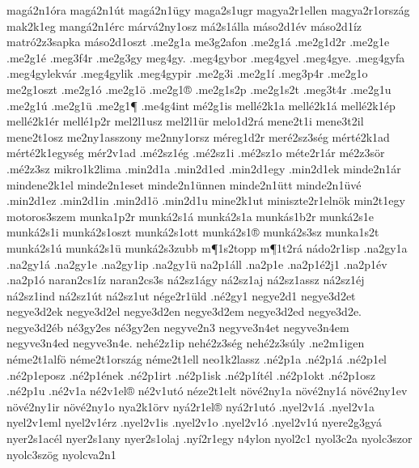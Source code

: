 {mag^^e12n1^^f3ra
mag^^e12n1^^fat
mag^^e12n1^^fcgy
maga2s1ugr
magya2r1ellen
magya2r1orsz^^e1g
mak2k1eg
mang^^e12n1^^e9rc
m^^e1rv^^e12ny1osz
m^^e12s1^^e1lla
m^^e1so2d1^^e9v
m^^e1so2d1^^edz
matr^^f32z3sapka
m^^e1so2d1oszt
.me2g1a
me3g2afon
.me2g1^^e1
.me2g1d2r
.me2g1e
.me2g1^^e9
.meg3f4r
.me2g3gy
meg4gy.
.meg4gybor
.meg4gyel
.meg4gye.
.meg4gyfa
.meg4gylekv^^e1r
.meg4gylik
.meg4gypir
.me2g3i
.me2g1^^ed
.meg3p4r
.me2g1o
me2g1oszt
.me2g1^^f3
.me2g1^^f6
.me2g1^^ae
.me2g1s2p
.me2g1s2t
.meg3t4r
.me2g1u
.me2g1^^fa
.me2g1^^fc
.me2g1^^b6
.me4g4int
m^^e92g1is
mell^^e92k1a
mell^^e92k1^^e1
mell^^e92k1^^e9p
mell^^e92k1^^e9r
mell^^e91p2r
mel2l1usz
mel2l1^^fcr
melo1d2r^^e1
mene2t1i
mene3t2il %
mene2t1osz
me2ny1asszony
me2nny1orsz
m^^e9reg1d2r
mer^^e92sz3s^^e9g
m^^e9rt^^e92k1ad
m^^e9rt^^e92k1egys^^e9g
m^^e9r2v1ad
.m^^e92sz1^^e9g
.m^^e92sz1i
.m^^e92sz1o
m^^e9te2r1^^e1r
m^^e92z3s^^f6r
.m^^e92z3sz
mikro1k2lima
.min2d1a
.min2d1ed
.min2d1egy
.min2d1ek
minde2n1^^e1r
mindene2k1el
minde2n1eset
minde2n1^^fcnnen
minde2n1^^fctt          %
minde2n1^^fcv^^e9          %
.min2d1ez
.min2d1in
.min2d1^^f6
.min2d1u
mine2k1ut
miniszte2r1eln^^f6k
min2t1egy
motoros3szem
munka1p2r
munk^^e12s1^^e1
munk^^e12s1a
munk^^e1s1b2r
munk^^e12s1e
munk^^e12s1i
munk^^e12s1oszt
munk^^e12s1ott
munk^^e12s1^^ae
munk^^e12s3sz
munka1s2t
munk^^e12s1^^fa
munk^^e12s1^^fc
munk^^e12s3zubb
m^^b61s2topp
m^^b61t2r^^e1
n^^e1do2r1isp
.na2gy1a
.na2gy1^^e1
.na2gy1e
.na2gy1ip
.na2gy1^^fc
na2p1^^e1ll
.na2p1e
.na2p1^^e92j1 %
.na2p1^^e9v
.na2p1^^f3
naran2cs1^^edz
naran2cs3s
n^^e12sz1^^e1gy
n^^e12sz1aj
n^^e12sz1assz
n^^e12sz1^^e9j
n^^e12sz1ind
n^^e12sz1^^fat
n^^e12sz1ut
n^^e9ge2r1^^fcld
.n^^e92gy1
negye2d1
negye3d2et
negye3d2ek
negye3d2el
negye3d2en
negye3d2em
negye3d2ed
negye3d2e.
negye3d2^^e9b %
n^^e93gy2es
n^^e93gy2en
negyve2n3
negyve3n4et
negyve3n4em
negyve3n4ed
negyve3n4e.
neh^^e92z1ip
neh^^e92z3s^^e9g
neh^^e92z3s^^faly
.ne2m1igen
n^^e9me2t1alf^^f6
n^^e9me2t1orsz^^e1g
n^^e9me2t1ell
neo1k2lassz
.n^^e92p1a
.n^^e92p1^^e1
.n^^e92p1el
.n^^e92p1eposz
.n^^e92p1^^e9nek
.n^^e92p1irt
.n^^e92p1isk
.n^^e92p1^^edt^^e9l
.n^^e92p1okt
.n^^e92p1osz
.n^^e92p1u
.n^^e92v1a
n^^e92v1el^^ae
n^^e92v1ut^^f3
n^^e9ze2t1elt
n^^f6v^^e92ny1a
n^^f6v^^e92ny1^^e1
n^^f6v^^e92ny1ev
n^^f6v^^e92ny1ir
n^^f6v^^e92ny1o
nya2k1^^f6rv
ny^^e12r1el^^ae
ny^^e12r1ut^^f3
.nyel2v1^^e1
.nyel2v1a
nyel2v1eml
nyel2v1^^e9rz
.nyel2v1is
.nyel2v1o
.nyel2v1^^f3
.nyel2v1^^fa
nyere2g3gy^^e1
nyer2s1ac^^e9l
nyer2s1any
nyer2s1olaj
.ny^^ed2r1egy %
n4ylon
nyol2c1
nyol3c2a
nyolc3szor
nyolc3sz^^f6g
nyolcva2n1
}
